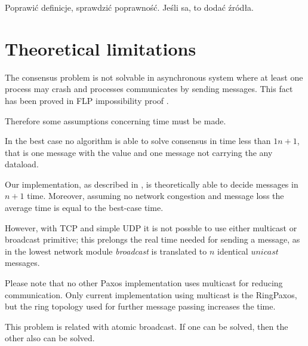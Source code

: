 \begin{TODO}
 Poprawić definicje, sprawdzić poprawność. Jeśli sa, to dodać źródła.
\end{TODO}

\section{Theoretical limitations}


The consensus problem is not solvable in asynchronous system where at least one process may crash and processes communicates by sending messages. This fact has been proved in FLP impossibility proof \cite{FLP}.

Therefore some assumptions concerning time must be made.


In the best case no algorithm is able to solve consensus in time less than $1n+1$, that is one message with the value and one message not carrying the any dataload.

Our implementation, as described in %
, is theoretically able to decide messages in $n+1$ time. Moreover, assuming no network congestion and message loss the average time is equal to the best-case time.

However, with TCP and simple UDP it is not possble to use either multicast or broadcast primitive; this prelongs the real time needed for sending a message, as in the lowest network module \emph{broadcast} is translated to $n$ identical $unicast$ messages.

Please note that no other Paxos implementation uses multicast for reducing communication. Only current implementation using multicast is the RingPaxos\cite{Mar10}, but the ring topology used for further message passing increases the time.


\begin{TODO}
 This problem is related with atomic broadcast. If one can be solved, then the other also can be solved.
\end{TODO}


